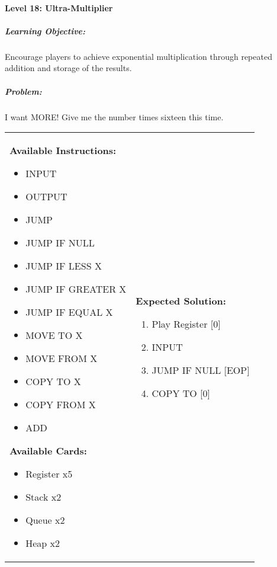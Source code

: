 \paragraph{Level 18: Ultra-Multiplier}
\subparagraph{Learning Objective:} Encourage players to achieve exponential multiplication through repeated addition and storage of the results.

\subparagraph{Problem:} I want MORE! Give me the number times sixteen this time.

\begin{center}
    \begin{tabular}{ | m{5cm} | m{9cm} | } 
        \hline
            \textbf{Available Instructions:} 
            \begin{itemize}
                \setlength\itemsep{-.35em}
                \item INPUT
                \item OUTPUT
                \item JUMP
                \item JUMP IF NULL
                \item JUMP IF LESS X
                \item JUMP IF GREATER X
		\item JUMP IF EQUAL X
                \item MOVE TO X
                \item MOVE FROM X
                \item COPY TO X
                \item COPY FROM X
		\item ADD
            \end{itemize}
            \textbf{Available Cards:} 
            \begin{itemize}
                \setlength\itemsep{-.35em}
                \item Register x5
		\item Stack x2
                \item Queue x2
                \item Heap x2
            \end{itemize}& 
            \textbf{Expected Solution:} 
            \begin{enumerate}
                \setlength\itemsep{-.35em}
		\item Play Register [0]
                \item INPUT
		\item JUMP IF NULL [EOP]
		\item COPY TO [0]

\end{enumerate}
\end{tabular}
\end{center}
